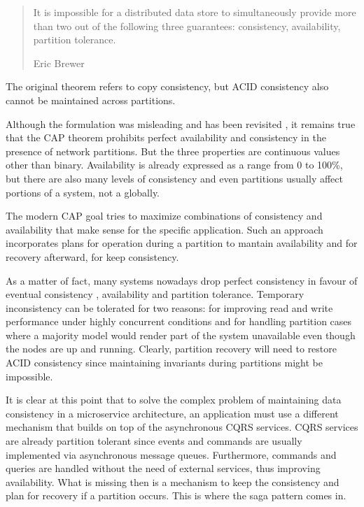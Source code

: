 \documentclass[conference]{IEEEtran}
\begin{document}
\begin{quote}
It is impossible for a distributed data store to simultaneously provide more than two out of the following three guarantees: consistency, availability, partition tolerance.

\hfill Eric Brewer
\end{quote}

The original theorem refers to copy consistency, but ACID consistency also cannot be maintained across partitions. 

Although the formulation was misleading and has been revisited \cite{cap-misleading}, it remains true that the CAP theorem prohibits perfect availability and consistency in the presence of network partitions. But the three properties are continuous values other than binary. Availability is already expressed as a range from 0 to 100\%, but there are also many levels of consistency and even partitions usually affect portions of a system, not a globally.

The modern CAP goal tries to maximize combinations of consistency and availability that make sense for the specific application. Such an approach incorporates plans for operation during a partition to mantain availability and for recovery afterward, for keep consistency.

As a matter of fact, many systems nowadays drop perfect consistency in favour of eventual consistency \cite{consistency-vs-availability}, availability and partition tolerance. Temporary inconsistency can be tolerated for two reasons: for improving read and write performance under highly concurrent conditions and for handling partition cases where a majority model would render part of the system unavailable even though the nodes are up and running. Clearly, partition recovery will need to restore ACID consistency since maintaining invariants during partitions might be impossible.

It is clear at this point that to solve the complex problem of maintaining data consistency in a microservice architecture, an application must use a different mechanism that builds on top of the asynchronous CQRS services. CQRS services are already partition tolerant since events and commands are usually implemented via asynchronous message queues. Furthermore, commands and queries are handled without the need of external services, thus improving availability. What is missing then is a mechanism to keep the consistency and plan for recovery if a partition occurs. This is where the saga pattern comes in.
\end{document}
